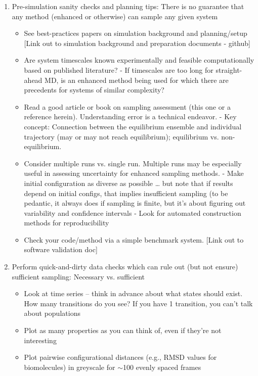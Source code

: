 \documentclass[9pt]{livecoms}
\begin{document}
\begin{enumerate}
\item
Pre-simulation sanity checks and planning tips: There is no guarantee that any method (enhanced or otherwise) can sample any given system
    \begin{itemize}
    \item See best-practices papers on simulation background and planning/setup [Link out to simulation background and preparation documents - github]
    \item Are system timescales known experimentally and feasible computationally based on published literature?
      - If timescales are too long for straight-ahead MD, is an enhanced method being used for which there are precedents for systems of similar complexity?
    \item Read a good article or book on sampling assessment (this one or a reference herein).  Understanding error is a technical endeavor.
      - Key concept: Connection between the equilibrium ensemble and individual trajectory (may or may not reach equilibrium); equilibrium vs. non-equilibrium.
    \item Consider multiple runs vs. single run.  Multiple runs may be especially useful in assessing uncertainty for enhanced sampling methods.
      - Make initial configuration as diverse as possible  … but note that if results depend on initial configs, that implies insufficient sampling (to be pedantic, it always does if sampling is finite, but it’s about figuring out variability and confidence intervals
      - Look for automated construction methods for reproducibility
    \item Check your code/method via a simple benchmark system.  [Link out to software validation doc]
    \end{itemize}
\item
Perform quick-and-dirty data checks which can rule out (but not ensure) sufficient sampling: Necessary vs. sufficient
    \begin{itemize}
    \item Look at time series -- think in advance about what states should exist. How many transitions do you see? If you have 1 transition, you can’t talk about populations
    \item Plot as many properties as you can think of, even if they’re not interesting
    \item Plot pairwise configurational distances (e.g., RMSD values for biomolecules) in greyscale for $\sim$100 evenly spaced frames

\end{itemize}
\end{enumerate}
\end{document}
